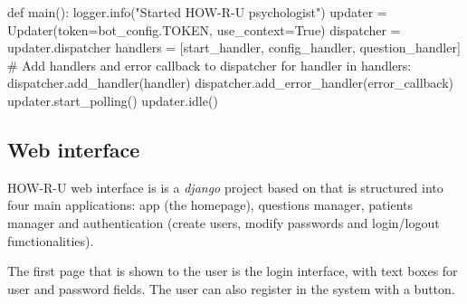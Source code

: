 \documentclass[12pt,english]{article}
\begin{document}
\begin{python}[caption={Bot file, the one that starts the service}, captionpos=b]
def main():
    logger.info("Started HOW-R-U psychologist")
    updater = Updater(token=bot_config.TOKEN, use_context=True)
    dispatcher = updater.dispatcher
    handlers = [start_handler, config_handler, question_handler]
    # Add handlers and error callback to dispatcher
    for handler in handlers:
        dispatcher.add_handler(handler)
    dispatcher.add_error_handler(error_callback)
    updater.start_polling()
    updater.idle()
\end{python}
\subsection{Web interface}
\label{sec:web_int}

HOW-R-U web interface is is a \emph{django} project based on \cite{appseed} that is structured into four main applications: app (the homepage), questions manager, patients manager and authentication (create users, modify passwords and login/logout functionalities).

The first page that is shown to the user is the login interface, with text boxes for user and password fields. The user can also register in the system with a button.
\end{document}
